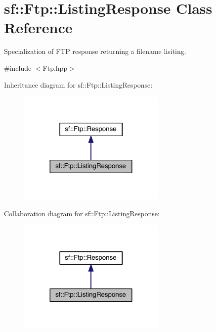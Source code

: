 \hypertarget{classsf_1_1_ftp_1_1_listing_response}{\section{sf\-:\-:Ftp\-:\-:Listing\-Response Class Reference}
\label{classsf_1_1_ftp_1_1_listing_response}
}


Specialization of F\-T\-P response returning a filename lisiting.  




{\ttfamily \#include $<$Ftp.\-hpp$>$}



Inheritance diagram for sf\-:\-:Ftp\-:\-:Listing\-Response\-:
\nopagebreak
\begin{figure}[H]
\begin{center}
\leavevmode
\includegraphics[width=204pt]{classsf_1_1_ftp_1_1_listing_response__inherit__graph}
\end{center}
\end{figure}


Collaboration diagram for sf\-:\-:Ftp\-:\-:Listing\-Response\-:
\nopagebreak
\begin{figure}[H]
\begin{center}
\leavevmode
\includegraphics[width=204pt]{classsf_1_1_ftp_1_1_listing_response__coll__graph}
\end{center}
\end{figure}
